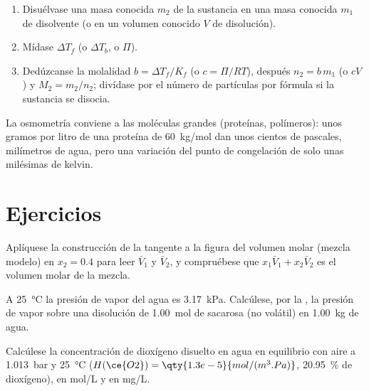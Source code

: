 \begin{method}\label{met:b2:chemical-potential:molar-mass}
\begin{enumerate}
  \item Disuélvase una masa conocida $m_2$ de la sustancia en una masa conocida $m_1$
        de disolvente (o en un volumen conocido $V$ de disolución).
  \item Mídase $\Delta T_f$ (o $\Delta T_b$, o $\Pi$).
  \item Dedúzcanse la molalidad $b = \Delta T_f/K_f$ (o $c = \Pi/RT$), después $n_2 =
        b\,m_1$ (o $cV$) y $M_2 = m_2/n_2$; divídase por el número de
        partículas por fórmula si la sustancia se disocia.
\end{enumerate}
La osmometría conviene a las moléculas grandes (proteínas, polímeros): unos gramos por litro
de una proteína de \qty{60}{kg/mol} dan unos cientos de pascales, milímetros de
agua, pero una variación del punto de congelación de solo unas milésimas de kelvin.
\end{method}

\section{Ejercicios}

\begin{exercise}[$\star$]\label{exo:b2:chemical-potential:1}
Aplíquese la construcción de la tangente a la figura del volumen molar (mezcla
modelo) en $x_2 = 0.4$ para leer $\bar V_1$ y $\bar V_2$, y compruébese que
$x_1\bar V_1 + x_2\bar V_2$ es el volumen molar de la mezcla.
\end{exercise}

\begin{exercise}[$\star$]\label{exo:b2:chemical-potential:2}
A \qty{25}{\celsius} la presión de vapor del agua es \qty{3.17}{kPa}.
Calcúlese, por la , la presión de vapor sobre una disolución de
\qty{1.00}{mol} de sacarosa (no volátil) en \qty{1.00}{kg} de agua.
\end{exercise}

\begin{exercise}[$\star$]\label{exo:b2:chemical-potential:3}
Calcúlese la concentración de dioxígeno disuelto en agua en equilibrio con
aire a \qty{1.013}{bar} y \qty{25}{\celsius} ($H(\ce{O2}) =
\qty{1.3e-5}{mol/(m^3.Pa)}$, \qty{20.95}{\percent} de dioxígeno), en
\unit{mol/L} y en \unit{mg/L}.
\end{exercise}

